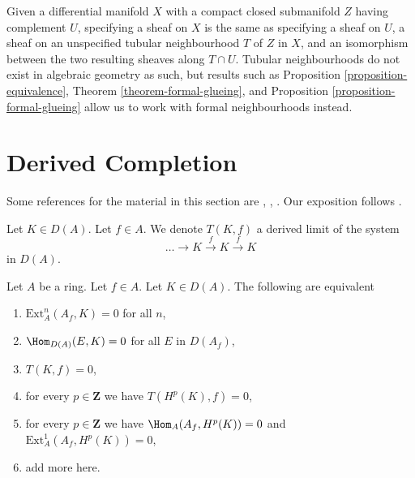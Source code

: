 \begin{remark}
\label{remark-topological-analogue}
Given a differential manifold $X$ with a compact closed submanifold $Z$
having complement $U$, specifying a sheaf on $X$ is the same as specifying
a sheaf on $U$, a sheaf on an unspecified tubular neighbourhood $T$ of $Z$ in
$X$, and an isomorphism between the two resulting sheaves along $T \cap U$.
Tubular neighbourhoods do not exist in algebraic geometry as such, but
results such as
Proposition \ref{proposition-equivalence},
Theorem \ref{theorem-formal-glueing}, and
Proposition \ref{proposition-formal-glueing}
allow us to work with formal neighbourhoods instead.
\end{remark}















\section{Derived Completion}
\label{section-derived-completion}

\noindent
Some references for the material in this section are
\cite{Dwyer-Greenlees}, \cite{Greenlees-May}, \cite{dag12}.
Our exposition follows \cite{BS}.

\medskip\noindent
Let $K \in D(A)$. Let $f \in A$. We denote $T(K, f)$ a derived limit
of the system
$$
\ldots \to K \xrightarrow{f} K \xrightarrow{f} K
$$
in $D(A)$.

\begin{lemma}
\label{lemma-hom-from-Af}
Let $A$ be a ring. Let $f \in A$. Let $K \in D(A)$.
The following are equivalent
\begin{enumerate}
\item $\text{Ext}^n_A(A_f, K) = 0$ for all $n$,
\item $\Hom_{D(A)}(E, K) = 0$ for all $E$ in $D(A_f)$,
\item $T(K, f) = 0$,
\item for every $p \in \mathbf{Z}$ we have $T(H^p(K), f) = 0$,
\item for every $p \in \mathbf{Z}$ we have
$\Hom_A(A_f, H^p(K)) = 0$ and $\text{Ext}^1_A(A_f, H^p(K)) = 0$,
\item add more here.
\end{enumerate}
\end{lemma}


